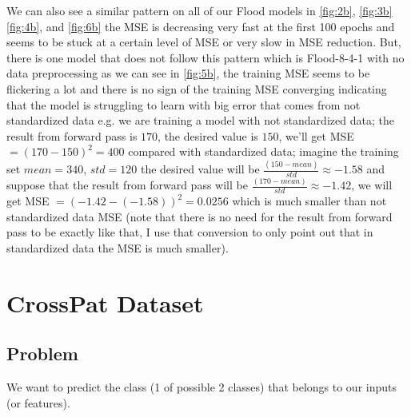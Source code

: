 \documentclass{article}
\begin{document}
We can also see a similar pattern on all of our Flood models in \cref{fig:2b}, \cref{fig:3b}
\cref{fig:4b}, and \cref{fig:6b} the MSE is decreasing very fast 
at the first 100 epochs and seems to be stuck at a certain level of MSE or 
very slow in MSE reduction. But, there is one model that does not follow this
pattern which is Flood-8-4-1 with no data preprocessing 
as we can see in \cref{fig:5b}, the training MSE seems to be flickering a lot
and there is no sign of the training MSE converging indicating that 
the model is struggling to learn with big error that comes 
from not standardized data e.g. we are training a model with not standardized data; the result from 
forward pass is $170$, the desired value is $150$, we'll get MSE $= (170 - 150)^{2} = 400$ 
compared with standardized data; imagine the training set $mean = 340$, 
$std = 120$ the desired value will be $\frac{(150 - mean)}{std} \approx -1.58$
and suppose that the result from forward pass will be $\frac{(170 - mean)}{std} \approx -1.42$,
we will get MSE $= (-1.42 -(-1.58))^{2} = 0.0256$ which is much smaller than not
standardized data MSE (note that there is no need for the result from forward pass to be exactly like that,
I use that conversion to only point out that in standardized data the MSE is much smaller).

\newpage
\section*{CrossPat Dataset}
\subsection*{Problem}
We want to predict the class (1 of possible 2 classes) that belongs
to our inputs (or features).
\end{document}
